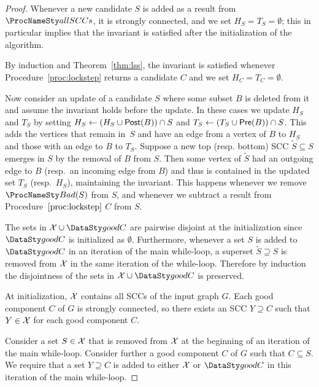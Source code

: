 \begin{proof}
\item
\smallskip{}
Whenever a new candidate $S$ is added as a result from $\sccalg$, it is strongly
connected, and we set $H_S = T_S = \emptyset$; this in particular implies that 
the invariant is satisfied after the initialization of the algorithm. 

By induction and Theorem~\ref{thm:lss}, the invariant is satisfied whenever
Procedure~\ref{proc:lockstep} returns a candidate $C$ and we set
$H_C = T_C = \emptyset$.

Now consider an update of a candidate $S$ where some subset
$B$ is deleted from it and assume the invariant holds before the update. In these
cases we update $H_S$ and $T_S$ by setting $H_S \gets (H_S \cup \mathsf{Post}(B)) \cap S$ 
and $T_S \gets (T_S \cup \mathsf{Pre}(B)) \cap S$. This adds the vertices that remain 
in~$S$ and have an edge from a vertex of $B$ to $H_S$ and those with an edge 
to $B$ to $T_S$. Suppose a new
top (resp. bottom) SCC $\tilde{S} \subseteq S$ emerges in $S$ by the removal 
of $B$ from $S$. Then some vertex of $\tilde{S}$ had an outgoing edge to $B$ (resp.\ an incoming edge from $B$)
and thus is contained in the updated set $T_S$ (resp.\ $H_S$),
maintaining the invariant. 
This happens whenever we remove $\bad(S)$ from $S$, and whenever
we subtract a result from Procedure~$\ref{proc:lockstep}$ $C$ from $S$.

\smallskip{}
The sets in $\mathcal{\ec} \cup \goodC$ are pairwise disjoint at the
initialization since $\goodC$ is initialized as $\emptyset$. Furthermore,
whenever a set $S$ is added to $\goodC$ in an iteration of the main
while-loop, a superset $\tilde{S} \supseteq S$ is removed from
$\mathcal{X}$ in the same iteration of the while-loop. Therefore
by induction the disjointness of the sets in $\mathcal{\ec} \cup \goodC$
is preserved.

\smallskip{}
At initialization, $\mathcal{X}$ contains all SCCs of the input graph $G$.
Each good component $C$ of $G$ is strongly connected, so there exists an SCC
$Y \supseteq C$ such that $Y \in \mathcal{X}$ for each good component $C$.

Consider a set $S \in \mathcal{X}$ that is removed from $\mathcal{X}$
at the beginning of an iteration of the main while-loop. Consider further
a good component $C$ of $G$ such that $C \subseteq S$. We require that a set
$Y \supseteq C$ is added to either
$\mathcal{X}$ or $\goodC$ in this iteration of the main while-loop.


\end{proof}
